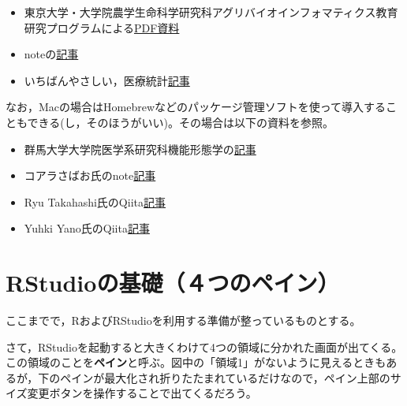 \documentclass[
  a4paper,
]{ltjsbook}
\providecommand{\tightlist}{%
  \setlength{\itemsep}{0pt}\setlength{\parskip}{0pt}}\usepackage{longtable,booktabs,array}
\begin{document}
\begin{itemize}
\tightlist
\item
  東京大学・大学院農学生命科学研究科アグリバイオインフォマティクス教育研究プログラムによる\href{https://www.iu.a.u-tokyo.ac.jp/textbook/R/R1.010_mac.pdf}{PDF資料}
\item
  noteの\href{https://note.com/toshi_matsuura/n/n127cf28362e5}{記事}
\item
  いちばんやさしい，医療統計\href{https://best-biostatistics.com/r/rstudio_start.html\#i-3}{記事}
\end{itemize}

なお，Macの場合はHomebrewなどのパッケージ管理ソフトを使って導入することもできる(し，そのほうがいい)。その場合は以下の資料を参照。

\begin{itemize}
\tightlist
\item
  群馬大学大学院医学系研究科機能形態学の\href{https://anatomy.med.gunma-u.ac.jp/protocols/?p=979}{記事}
\item
  コアラさばお氏のnote\href{https://note.com/mackerelman/n/nfbf8054e90d5}{記事}
\item
  Ryu
  Takahashi氏のQiita\href{https://qiita.com/ryu-takahashi2718/items/1118cad7a4ef4900da96}{記事}
\item
  Yuhki
  Yano氏のQiita\href{https://qiita.com/y-vectorfield/items/dd1a8e2715cace9981ec}{記事}
\end{itemize}

\hypertarget{rstudioux306eux57faux790euxff14ux3064ux306eux30daux30a4ux30f3-1}{%
\section{RStudioの基礎（４つのペイン）}\label{rstudioux306eux57faux790euxff14ux3064ux306eux30daux30a4ux30f3-1}}

ここまでで，RおよびRStudioを利用する準備が整っているものとする。

さて，RStudioを起動すると大きくわけて4つの領域に分かれた画面が出てくる。この領域のことを\textbf{ペイン}と呼ぶ。図中の「領域1」がないように見えるときもあるが，下のペインが最大化され折りたたまれているだけなので，ペイン上部のサイズ変更ボタンを操作することで出てくるだろう。
\end{document}
